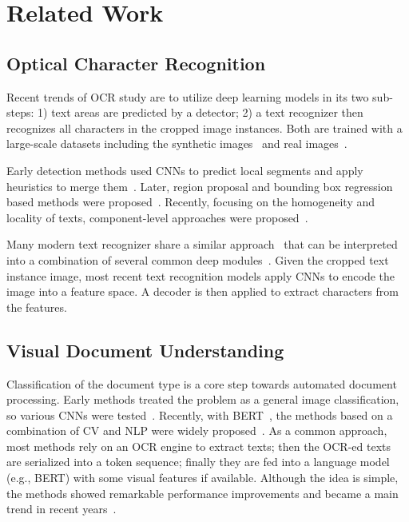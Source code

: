 \documentclass[runningheads]{llncs}
\begin{document}
\section{Related Work}
\subsection{Optical Character Recognition}
Recent trends of OCR study are to utilize deep learning models in its two sub-steps: 1) text areas are predicted by a detector; 2) a text recognizer then recognizes all characters in the cropped image instances. Both are trained with a large-scale datasets including the synthetic images~\cite{Jaderberg14c,Gupta16} and real images~\cite{7333942,Phan_2013_ICCV}. 

Early detection methods used CNNs to predict local segments and apply heuristics to merge them~\cite{Huang10.1007/978-3-319-10593-2_33,Zhang_2016_CVPR}.
Later, region proposal and bounding box regression based methods were proposed~\cite{LiaoSBWL17}. Recently, focusing on the homogeneity and locality of texts, component-level approaches were proposed~\cite{CTPN,baek2019craft}. 

Many modern text recognizer share a similar approach~\cite{starnet,Shi2016RobustST,Shi2017AnET,jianfeng2017deep} that can be interpreted into a combination of several common deep modules~\cite{baek2019wrong}. Given the cropped text instance image,
most recent text recognition models apply CNNs to encode the image into a feature space. A decoder is then applied to extract characters from the features.



\subsection{Visual Document Understanding}
Classification of the document type is a core step towards automated document processing.
Early methods treated the problem as a general image classification, so various CNNs were tested~\cite{Kang2014ConvolutionalNN,7333933,7333910}. Recently, with  BERT~\cite{devlinBERT2018}, the methods based on a combination of CV and NLP were widely proposed~\cite{xu2019_layoutLM,li-etal-2021-structurallm}.
As a common approach, most methods rely on an OCR engine to extract texts; then the OCR-ed texts are serialized into a token sequence; finally they are fed into a language model (e.g., BERT) with some visual features if available.
Although the idea is simple, the methods showed remarkable performance improvements and became a main trend in recent years~\cite{xu-etal-2021-layoutlmv2,selfdoc,Appalaraju_2021_ICCV}. 
\end{document}
